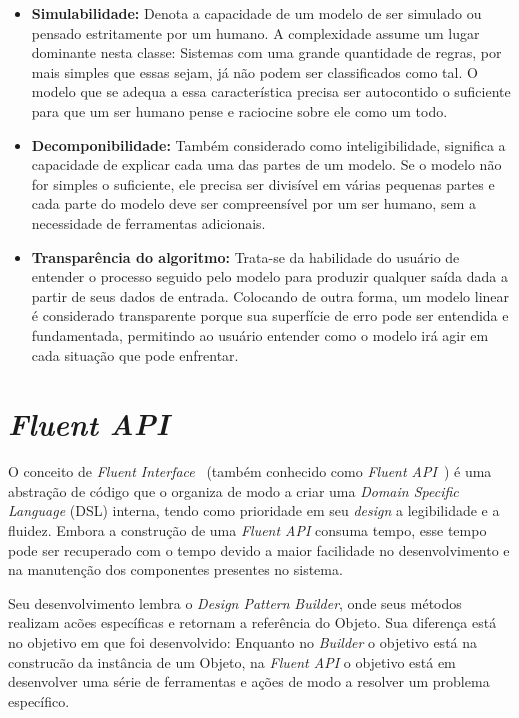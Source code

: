 \documentclass[portugues]{ic-tese}
\begin{document}
\begin{itemize}
\item \textbf{Simulabilidade:} Denota a capacidade de um modelo de ser simulado ou pensado estritamente por um humano. A complexidade assume um lugar dominante nesta classe: Sistemas com uma grande quantidade de regras, por mais simples que essas sejam, já não podem ser classificados como tal. O modelo que se adequa a essa característica precisa ser autocontido o suficiente para que um ser humano pense e raciocine sobre ele como um todo.
\item \textbf{Decomponibilidade:} Também considerado como inteligibilidade, significa a capacidade de explicar cada uma das partes de um modelo. Se o modelo não for simples o suficiente, ele precisa ser divisível em várias pequenas partes e cada parte do modelo deve ser compreensível por um ser humano, sem a necessidade de ferramentas adicionais.
\item \textbf{Transparência do algoritmo:} Trata-se da habilidade do usuário de entender o processo seguido pelo modelo para produzir qualquer saída dada a partir de seus dados de entrada. Colocando de outra forma, um modelo linear é considerado transparente porque sua superfície de erro pode ser entendida e fundamentada, permitindo ao usuário entender como o modelo irá agir em cada situação que pode enfrentar.
\end{itemize}

\section{\textit{Fluent API}}
\label{app:FluentAPI}

O conceito de \textit{Fluent Interface}~\citep{Fowler_2005} (também conhecido como \textit{Fluent API}~\citep{Nakamaru_2020}) é uma abstração de código que o organiza de modo a criar uma \textit{Domain Specific Language} (DSL) interna, tendo como prioridade em seu \textit{design} a legibilidade e a fluidez. Embora a construção de uma \textit{Fluent API} consuma tempo, esse tempo pode ser recuperado com o tempo devido a maior facilidade no desenvolvimento e na manutenção dos componentes presentes no sistema.

Seu desenvolvimento lembra o \textit{Design Pattern} \textit{Builder}, onde seus métodos realizam acões específicas e retornam a referência do Objeto. Sua diferença está no objetivo em que foi desenvolvido: Enquanto no \textit{Builder} o objetivo está na construcão da instância de um Objeto, na \textit{Fluent API} o objetivo está em desenvolver uma série de ferramentas e ações de modo a resolver um problema específico.
\end{document}
